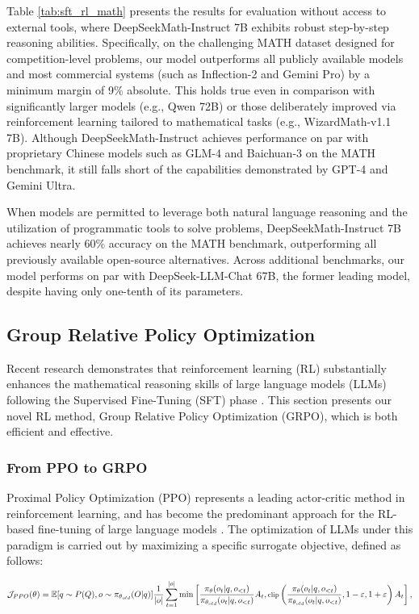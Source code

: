 \begin{itemize}[topsep=0pt]
\begin{itemize}[topsep=0pt]
Table \ref{tab:sft_rl_math} presents the results for evaluation without access to external tools, where DeepSeekMath-Instruct 7B exhibits robust step-by-step reasoning abilities. Specifically, on the challenging MATH dataset designed for competition-level problems, our model outperforms all publicly available models and most commercial systems (such as Inflection-2 and Gemini Pro) by a minimum margin of 9\% absolute. This holds true even in comparison with significantly larger models (e.g., Qwen 72B) or those deliberately improved via reinforcement learning tailored to mathematical tasks (e.g., WizardMath-v1.1 7B). Although DeepSeekMath-Instruct achieves performance on par with proprietary Chinese models such as GLM-4 and Baichuan-3 on the MATH benchmark, it still falls short of the capabilities demonstrated by GPT-4 and Gemini Ultra.

When models are permitted to leverage both natural language reasoning and the utilization of programmatic tools to solve problems, DeepSeekMath-Instruct 7B achieves nearly 60\% accuracy on the MATH benchmark, outperforming all previously available open-source alternatives. Across additional benchmarks, our model performs on par with DeepSeek-LLM-Chat 67B, the former leading model, despite having only one-tenth of its parameters.

\subsection{Group Relative Policy Optimization} Recent research demonstrates that reinforcement learning (RL) substantially enhances the mathematical reasoning skills of large language models (LLMs) following the Supervised Fine-Tuning (SFT) phase \citep{wang2023math,wizardmath}. This section presents our novel RL method, Group Relative Policy Optimization (GRPO), which is both efficient and effective.

\subsubsection{From PPO to GRPO} Proximal Policy Optimization (PPO) \citep{schulman2017proximal} represents a leading actor-critic method in reinforcement learning, and has become the predominant approach for the RL-based fine-tuning of large language models \citep{ouyang2022training}. The optimization of LLMs under this paradigm is carried out by maximizing a specific surrogate objective, defined as follows:

\begin{equation}
\footnotesize
    \mathcal{J}_{PPO}(\theta) = \mathbb{E}{[q \sim P(Q), o \sim \pi_{\theta_{old}}(O|q)]} \frac{1}{|o|} \sum_{t=1}^{|o|} \min \left[ \frac{\pi_\theta(o_{t} | q, o_{<t})}{\pi_{\theta_{old}}(o_{t} | q, o_{<t})} A_{t}, \text{clip} \left( \frac{\pi_\theta(o_{t} | q, o_{<t})}{\pi_{\theta_{old}}(o_{t} | q, o_{<t})}, 1 - \varepsilon, 1 + \varepsilon \right)  A_{t} \right] ,
\end{equation}


\end{itemize}
\end{itemize}
